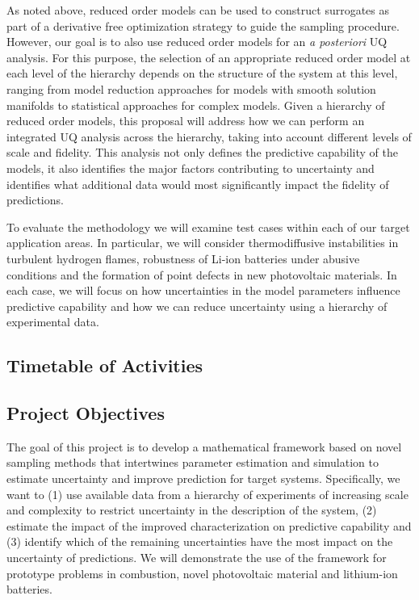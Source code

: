 \documentclass[11pt]{article}
\begin{document}
As noted above, reduced order models can be used to construct surrogates as part of a derivative free optimization strategy
to guide the sampling procedure. However, our goal is to also use reduced order models for an {\it {a posteriori}} UQ analysis.
For this purpose, the selection of an appropriate reduced order model at each level of the hierarchy depends on the
structure of the system at this level, ranging from model reduction approaches for models with smooth solution manifolds
to statistical approaches for complex models.
Given a hierarchy of reduced order models, this proposal will address how we can perform an integrated UQ analysis 
across the hierarchy, taking into account different levels of scale and fidelity.
This analysis not only defines the predictive capability of the models, it also identifies
the major factors contributing to uncertainty and identifies what additional data would most significantly
impact the fidelity of predictions.

To evaluate the methodology we will examine test cases within each of our target application areas.  In particular,
we will consider thermodiffusive instabilities in turbulent hydrogen flames, robustness of Li-ion batteries under abusive conditions
and the formation of point defects in new photovoltaic materials.  In each case, we will focus on how uncertainties in the 
model parameters influence predictive capability and how we can reduce uncertainty using a hierarchy of experimental data.


\subsection*{Timetable of Activities}

\subsection*{Project Objectives}

The goal of this project is to develop a mathematical framework  
based on novel sampling methods that
intertwines parameter estimation and simulation 
to estimate uncertainty and improve prediction for target systems.
Specifically, we want to
(1) use available data from a hierarchy
of experiments of increasing scale and complexity to restrict
uncertainty in the description of the system, (2) estimate the impact of the improved characterization
on predictive capability and (3) identify which of the remaining uncertainties have the most impact
on the uncertainty of predictions.
We will demonstrate the use of the framework for prototype problems in combustion,
novel photovoltaic material and lithium-ion batteries.




 
\end{document}
